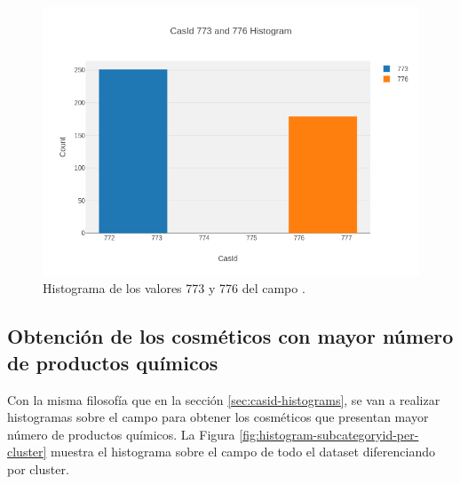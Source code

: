 \begin{figure}[!th]
\includegraphics[scale=0.49]{figures/histogram-casid-773-776}
\centering
\caption{Histograma de los valores 773 y 776 del campo .}
\label{fig:histogram-casid-773-776}
\end{figure}








\newpage
\subsection{Obtención de los cosméticos con mayor número de productos químicos}
\label{sec:subcategoryid-histograms}

Con la misma filosofía que en la sección \ref{sec:casid-histograms}, se van a realizar histogramas sobre el campo  para obtener los cosméticos que presentan mayor número de productos químicos. La Figura \ref{fig:histogram-subcategoryid-per-cluster} muestra el histograma sobre el campo  de todo el dataset diferenciando por cluster.

